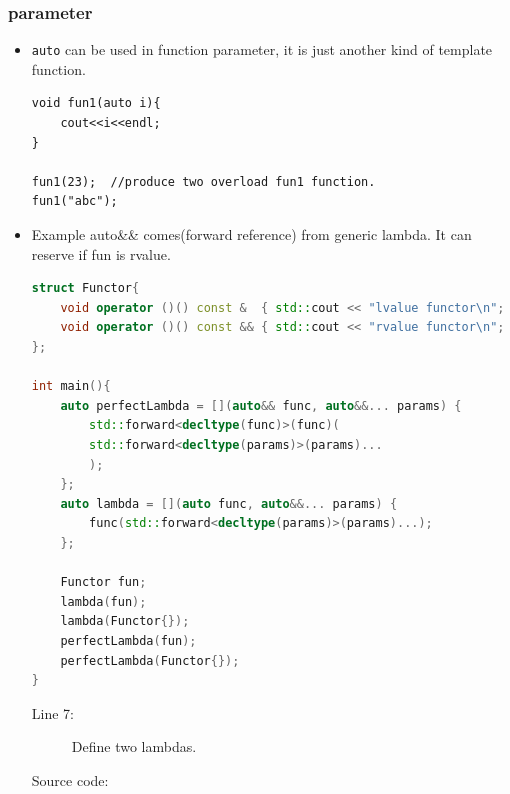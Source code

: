 \documentclass[a4paper,11pt,twoside]{book}
\begin{document}
\subsubsection{parameter}
\begin{itemize}
\item \texttt{auto} can be used in function parameter, it is just another kind of template function.
\begin{lstlisting}[numbers=none]
void fun1(auto i){
	cout<<i<<endl;
}

fun1(23);  //produce two overload fun1 function.
fun1("abc");
\end{lstlisting}

\item Example auto\&\& comes(forward reference) from generic lambda. It can reserve if fun is rvalue.
\begin{lstlisting}[frame=single, language=c++]
struct Functor{
	void operator ()() const &  { std::cout << "lvalue functor\n"; }
	void operator ()() const && { std::cout << "rvalue functor\n"; }
};

int main(){
	auto perfectLambda = [](auto&& func, auto&&... params) {
		std::forward<decltype(func)>(func)(
		std::forward<decltype(params)>(params)...
		);
	};
	auto lambda = [](auto func, auto&&... params) {
		func(std::forward<decltype(params)>(params)...);
	};

	Functor fun;
	lambda(fun);
	lambda(Functor{});
	perfectLambda(fun);
	perfectLambda(Functor{});
}
\end{lstlisting}
\begin{description}
	\item[Line 7:] Define two lambdas.
	\item[Source code:]
\end{description}
\end{itemize}
\end{document}
